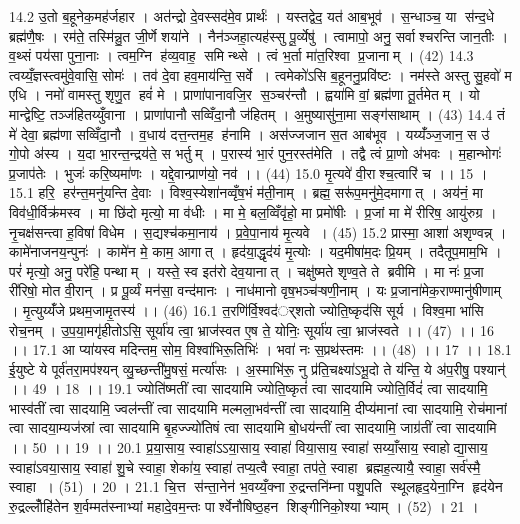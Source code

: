 14.2
उ॒तो ब॒हूनेक॒मह॑र्जहार । अत॑न्द्रो दे॒वस्सद॑मे॒व प्रार्थः॑ । यस्तद्वेद॒ यत॑ आब॒भूव॑ । स॒न्धाञ्च॒ या स॑न्द॒धे ब्रह्म॑णै॒षः । रम॑ते॒ तस्मि॑न्नु॒त जी॒र्णे शया॑ने । नैन॑ञ्जहा॒त्यह॑स्सु पू॒र्व्येषु॑ । त्वामापो॒ अनु॒ सर्वाश्चरन्ति जान॒तीः । व॒थ्सं पय॑सा पुना॒नाः । त्वम॒ग्नि ह॑व्य॒वाह॒॒ समिन्थ्से । त्वं भ॒र्ता मा॑त॒रिश्वा प्र॒जानाम् । (42)
14.3
त्वय्यँ॒ज्ञस्त्वमु॑वे॒वासि॒ सोमः॑ । तव॑ दे॒वा हव॒माय॑न्ति॒ सर्वे । त्वमेको॑ऽसि ब॒हूननु॒प्रवि॑ष्टः । नम॑स्ते अस्तु सु॒हवो॑ म एधि । नमो॑ वामस्तु शृणु॒त हवं॑ मे । प्राणा॑पानावजि॒र स॒ञ्चर॑न्तौ । ह्वया॑मि वां॒ ब्रह्म॑णा तू॒र्तमेतम् । यो मान्द्वेष्टि॒ तञ्ज॑हितय्युँवाना । प्राणा॑पानौ सव्विँदा॒नौ ज॑हितम् । अ॒मुष्यासु॑ना॒मा सङ्ग॑साथाम् । (43)
14.4
तं मे॑ देवा॒ ब्रह्म॑णा सव्विँदा॒नौ । व॒धाय॑ दत्त॒न्तम॒ह ह॑नामि । अस॑ज्जजान स॒त आब॑भूव । यय्यँ॑ञ्ज॒जान॒ स उ॑ गो॒पो अ॑स्य । य॒दा भा॒रन्त॒न्द्रय॑ते॒ स भर्तुम् । प॒रास्य॑ भा॒रं पुन॒रस्त॑मेति । तद्वै त्वं प्रा॒णो अ॑भवः । म॒हान्भोगः॑ प्र॒जाप॑तेः । भुजः॑ करि॒ष्यमा॑णः । यद्दे॒वान्प्राण॑यो॒ नव॑ ।। (44)
15.0
मृ॒त्यवे॑ वी॒राश्च॒त्वारि॑ च ।। 15 ।
15.1
हरि॒॒ हर॑न्त॒मनु॑यन्ति दे॒वाः । विश्व॒स्येशा॑नव्वृँष॒भं म॑ती॒नाम् । ब्रह्म॒ सरू॑प॒मनु॑मे॒दमागात् । अय॑नं॒ मा विव॑धी॒र्विक्र॑मस्व । मा छि॑दो मृत्यो॒ मा व॑धीः । मा मे॒ बल॒व्विँवृ॑हो॒ मा प्रमो॑षीः । प्र॒जां मा मे॑ रीरिष॒ आयु॑रुग्र । नृ॒चक्ष॑सन्त्वा ह॒विषा॑ विधेम । स॒द्यश्च॑कमा॒नाय॑ । प्र॒वे॒पा॒नाय॑ मृ॒त्यवे । (45)
15.2
प्रास्मा॒ आशा॑ अशृण्वन्न् । कामे॑नाजनय॒न्पुनः॑ । कामे॑न मे॒ काम॒ आगात् । हृद॑या॒द्धृद॑यं मृ॒त्योः । यद॒मीषा॑म॒दः प्रि॒यम् । तदैतूप॒माम॒भि । परं॑ मृत्यो॒ अनु॒ परे॑हि॒ पन्थाम् । यस्ते॒ स्व इत॑रो देव॒यानात् । चक्षु॑ष्मते शृण्व॒ते ते ब्रवीमि । मा नः॑ प्र॒जा री॑रिषो॒ मोत वी॒रान् । प्र पू॒र्व्यं मन॑सा॒ वन्द॑मानः । नाध॑मानो वृष॒भञ्च॑ऱ्षणी॒नाम् । यः प्र॒जाना॑मेक॒राण्मानु॑षीणाम् । मृ॒त्युय्यँ॑जे प्रथम॒जामृ॒तस्य॑ ।। (46)
16.1
त॒रणि॑र्वि॒श्वद॑र््शतो ज्योति॒ष्कृद॑सि सूर्य । विश्व॒मा भा॑सि रोच॒नम् । उ॒प॒या॒मगृ॑हीतोऽसि॒ सूर्या॑य त्वा॒ भ्राज॑स्वत ए॒ष ते॒ योनिः॒ सूर्या॑य त्वा॒ भ्राज॑स्वते ।। (47) ।। 16 ।।
17.1
आ प्या॑यस्व मदिन्तम॒ सोम॒ विश्वा॑भिरू॒तिभिः॑ । भवा॑ नः स॒प्रथ॑स्तमः ।। (48) ।। 17 ।।
18.1
ई॒युष्टे ये पूर्व॑तरा॒मप॑श्यन् व्यु॒च्छन्ती॑मु॒षसं॒ मर्त्या॑सः । अ॒स्माभि॑रू॒ नु प्र॑ति॒चक्ष्या॑ऽभू॒दो ते य॑न्ति॒ ये अ॑प॒रीषु॒ पश्यान्॑ ।। 49 । 18 ।।
19.1
ज्योति॑ष्मतीं त्वा सादयामि ज्योति॒ष्कृतं॑ त्वा सादयामि ज्योति॒र्विदं॑ त्वा सादयामि॒ भास्व॑तीं त्वा सादयामि॒ ज्वल॑न्तीं त्वा सादयामि मल्मला॒भव॑न्तीं त्वा सादयामि॒ दीप्य॑मानां त्वा सादयामि॒ रोच॑मानां त्वा सादया॒म्यज॑स्रां त्वा सादयामि बृ॒हज्ज्यो॑तिषं त्वा सादयामि बो॒धय॑न्तीं त्वा सादयामि॒ जाग्र॑तीं त्वा सादयामि ।। 50 ।। 19 ।।
20.1
प्र॒या॒साय॒ स्वाहा॑ऽऽया॒साय॒ स्वाहा॑ विया॒साय॒ स्वाहा॑ सय्याँ॒साय॒ स्वाहोद्या॒साय॒ स्वाहा॑ऽवया॒साय॒ स्वाहा॑ शु॒चे स्वाहा॒ शेका॑य॒ स्वाहा॑ तप्य॒त्वै स्वाहा॒ तप॑ते॒ स्वाहा ब्रह्मह॒त्यायै॒ स्वाहा॒ सर्व॑स्मै॒ स्वाहा । (51) । 20 ।
21.1
चि॒त्त स॑न्ता॒नेन॑ भ॒वय्यँ॒क्ना रु॒द्रन्तनि॑म्ना पशु॒पति॑ स्थूलहृद॒येना॒ग्नि हृद॑येन रु॒द्रल्लोँहि॑तेन श॒र्वम्मत॑स्नाभ्यां महादे॒वम॒न्तः पार्श्वेनौषिष्ठ॒हन॑ शिङ्गीनिको॒श्याभ्याम् । (52) । 21 ।

